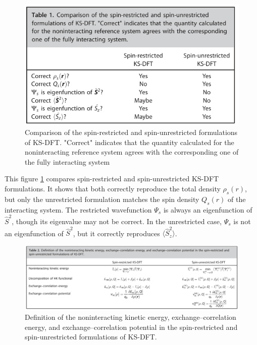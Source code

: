 \documentclass[%
 preprint, linenumbers,
 amsmath,amssymb,
 aps, physrev,
]{revtex4-2}
\begin{document}
\begin{figure}[H]
    \centering
    \includegraphics[width=0.9\linewidth]{tabla1.png}
    \caption{Comparison of the spin-restricted and spin-unrestricted
 formulations of KS-DFT. "Correct" indicates that the quantity calculated
 for the noninteracting reference system agrees with the corresponding
 one of the fully interacting system}
    \label{fig:enter-label1}
\end{figure}

This figure \ref{fig:enter-label1} compares spin-restricted and spin-unrestricted KS-DFT formulations. It shows that both correctly reproduce the total density \( \rho_s(r) \), but only the unrestricted formulation matches the spin density \( Q_s(r) \) of the interacting system. The restricted wavefunction \( \Psi_s \) is always an eigenfunction of \( \hat{S}^2 \), though its eigenvalue may not be correct. In the unrestricted case, \( \Psi_s \) is not an eigenfunction of \( \hat{S}^2 \), but it correctly reproduces \( \langle \hat{S}_z^2 \rangle \).
 
\begin{figure}[H]
    \centering
    \includegraphics[width=1.1\linewidth]{tabla2.png}
    \caption{Definition of the noninteracting kinetic energy, exchange–correlation energy, and exchange–correlation potential in the spin-restricted and
 spin-unrestricted formulations of KS-DFT.}
    \label{fig:enter-label2}
\end{figure}
\end{document}
